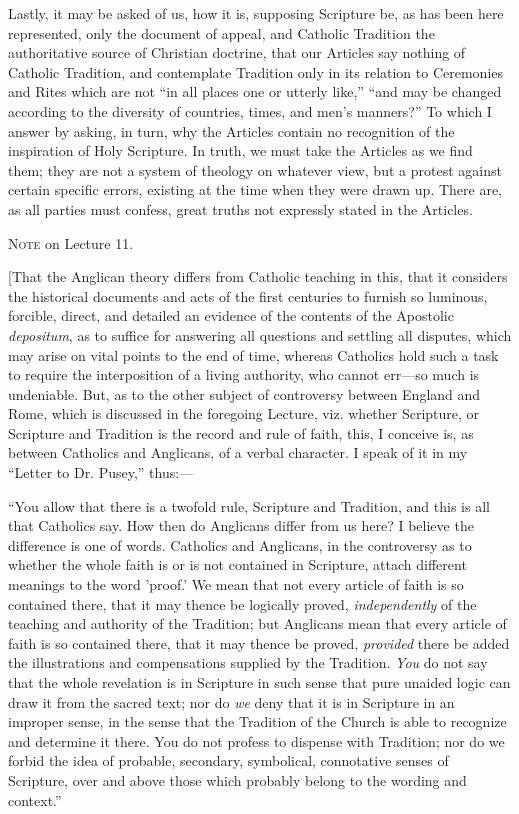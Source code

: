 Lastly, it may be asked of us, how it is, supposing Scripture be,
as has been here represented, only the document of appeal, and
Catholic Tradition the authoritative source of Christian doctrine,
that our Articles say nothing of Catholic Tradition, and contemplate
Tradition only in its relation to Ceremonies and Rites which are not
``in all places one or utterly like,'' ``and may be
changed according to the diversity of countries, times, and men's
manners?'' To which I answer by asking, in turn, why the Articles
contain no recognition of the inspiration of Holy Scripture. In
truth, we must take the Articles as we find them; they are not a
system of theology on whatever view, but a protest against certain
specific errors, existing at the time when they were drawn up. There
are, as all parties must confess, great truths not expressly stated in
the Articles.

N\textsc{ote} on Lecture 11.

[That the Anglican theory differs from Catholic teaching in this,
that it considers the historical documents and acts of the first
centuries to furnish so luminous, forcible, direct, and detailed an
evidence of the contents of the Apostolic \emph{depositum}, as to
suffice for answering all questions and settling all disputes, which
may arise on vital points to the end of time, whereas Catholics hold
such a task to require the interposition of a living authority, who
cannot err—so much is undeniable. But, as to the other subject of
controversy between England and Rome, which is discussed in the
foregoing Lecture, viz. whether Scripture, or Scripture and Tradition
is the record and rule of faith, this, I conceive is, as between
Catholics and Anglicans, of a verbal character. I speak of it in my
``Letter to Dr. Pusey,'' thus:—

``You allow that there is a twofold rule, Scripture and
Tradition, and this is all that Catholics say. How then do Anglicans
differ from us here? I believe the difference is one of words.
Catholics and Anglicans, in the controversy as to whether the whole
faith is or is not contained in Scripture, attach different meanings
to the word 'proof.' We mean that not every article of faith is so
contained there, that it may thence be logically proved, \emph{independently}
of the teaching and authority of the Tradition; but Anglicans mean
that every article of faith is so contained there, that it may thence
be proved, \emph{provided} there be added the illustrations and compensations
supplied by the Tradition. \emph{You} do not say that the whole revelation is
in Scripture in such sense that pure unaided logic can draw it from
the sacred text; nor do \emph{we} deny that it is in Scripture in an improper
sense, in the sense that the Tradition of the Church is able to
recognize and determine it there. You do not profess to dispense with
Tradition; nor do we forbid the idea of probable, secondary,
symbolical, connotative senses of Scripture, over and above those
which probably belong to the wording and context.''

